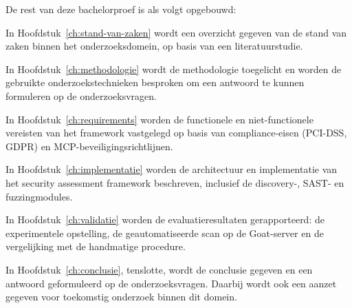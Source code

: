 
De rest van deze bachelorproef is als volgt opgebouwd:

In Hoofdstuk~\ref{ch:stand-van-zaken} wordt een overzicht gegeven van de stand van zaken binnen het onderzoeksdomein, op basis van een literatuurstudie.

In Hoofdstuk~\ref{ch:methodologie} wordt de methodologie toegelicht en worden de gebruikte onderzoekstechnieken besproken om een antwoord te kunnen formuleren op de onderzoeksvragen.

In Hoofdstuk~\ref{ch:requirements} worden de functionele en niet-functionele vereisten van het framework vastgelegd op basis van compliance-eisen (PCI-DSS, GDPR) en MCP-beveiligings\-richtlijnen.

In Hoofdstuk~\ref{ch:implementatie} worden de architectuur en implementatie van het security assessment framework beschreven, inclusief de discovery-, SAST- en fuzzingmodules.

In Hoofdstuk~\ref{ch:validatie} worden de evaluatieresultaten gerapporteerd: de experimentele opstelling, de geautomatiseerde scan op de Goat-server en de vergelijking met de handmatige procedure.

In Hoofdstuk~\ref{ch:conclusie}, tenslotte, wordt de conclusie gegeven en een antwoord geformuleerd op de onderzoeksvragen. Daarbij wordt ook een aanzet gegeven voor toekomstig onderzoek binnen dit domein.